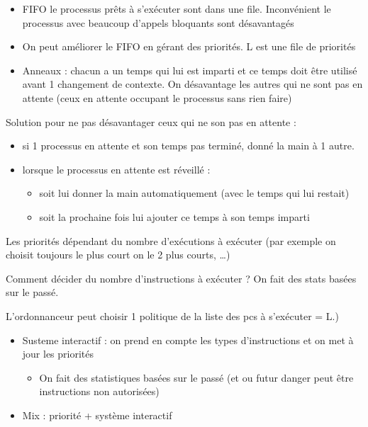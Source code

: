 \documentclass[11pt, a4paper]{article}
\begin{document}
\begin{itemize}
\item FIFO le processus prêts à s'exécuter sont dans une file. Inconvénient le processus avec beaucoup d'appels bloquants sont désavantagés
\item On peut améliorer le FIFO en gérant des priorités. L est une file de priorités
\item Anneaux : chacun a un temps qui lui est imparti et ce temps doit être utilisé avant 1 changement de contexte. On désavantage les autres qui ne sont pas en attente (ceux en attente occupant le processus sans rien faire)
\end{itemize}

Solution pour ne pas désavantager ceux qui ne son pas en attente :
 
\begin{itemize}
\item si 1 processus en attente et son temps pas terminé, donné la main à 1 autre.
\item lorsque le processus en attente est réveillé : 
    \begin{itemize}
    \item soit lui donner la main automatiquement (avec le temps qui lui restait)
    \item soit la prochaine fois lui ajouter ce temps à son temps imparti
    \end{itemize}
\end{itemize}

Les priorités dépendant du nombre d'exécutions à exécuter (par exemple on choisit toujours le plus court on le 2 plus courts, \dots)

Comment décider du nombre d'instructions à exécuter ? On fait des stats basées sur le passé.

L'ordonnanceur peut choisir 1 politique de la liste des pcs à s’exécuter = L.)

\begin{itemize}
\item Susteme interactif : on prend en compte les types d'instructions et on met à jour les priorités
    \begin{itemize}
        \item On fait des statistiques basées sur le passé (et ou futur danger peut être instructions non autorisées)
    \end{itemize}
\item Mix : priorité + système interactif
\end{itemize}
\end{document}
